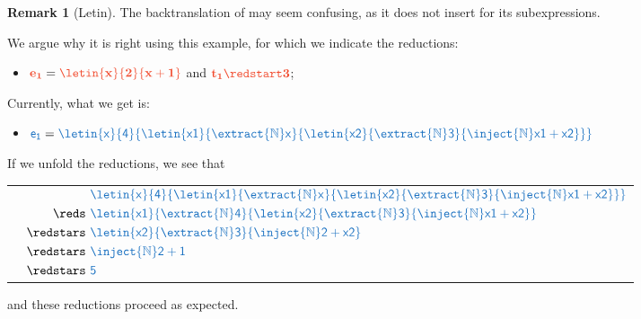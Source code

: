 \documentclass{article}
\theoremstyle{definition}
\newtheorem{remark}[theorem]{Remark}
\begin{document}
\begin{remark}[Letin]
	The backtranslation of  may seem confusing, as it does not insert \inject{\Nat} for its subexpressions.

	We argue why it is right using this example, for which we indicate the reductions:
	\begin{itemize}
		\item $\trg{e_1}=\trg{\letin{x}{2}{x+1}}$ and $\trg{t_1 \redstart 3}$;
	\end{itemize}

	Currently, what we get is:
	\begin{itemize}
		\item $\src{e_1}=\src{\letin{x}{4}{\letin{x1}{\extract{\Nat}x}{\letin{x2}{\extract{\Nat}3}{\inject{\Nat}x1+x2}}}}$
	\end{itemize}
	If we unfold the reductions, we see that 

	\begin{tabular}{c|c}
	\src{e_1}
	&
	{$\begin{aligned}
		&
		\src{\letin{x}{4}{\letin{x1}{\extract{\Nat}x}{\letin{x2}{\extract{\Nat}3}{\inject{\Nat}x1+x2}}}}
		\\
		\reds\
		&
		\src{{\letin{x1}{\extract{\Nat}4}{\letin{x2}{\extract{\Nat}3}{\inject{\Nat}x1+x2}}}}
		\\
		\redstars\
		&
		\src{{{\letin{x2}{\extract{\Nat}3}{\inject{\Nat}2+x2}}}}
		\\
		\redstars\
		&
		\src{{{{\inject{\Nat}2+1}}}}
		\\
		\redstars\
		&
		\src{5}
	\end{aligned}$}
	\end{tabular}	

	and these reductions proceed as expected.


\end{remark}
\end{document}
